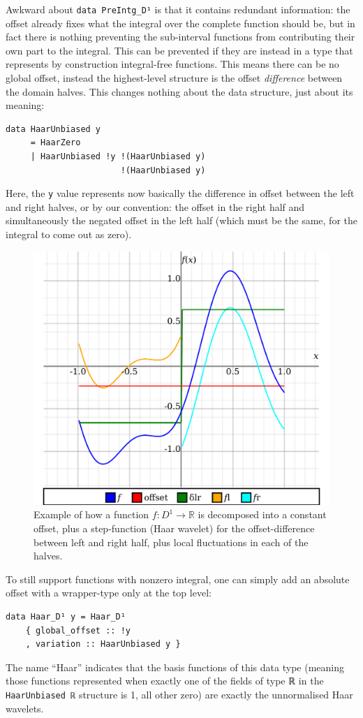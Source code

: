 \documentclass[sigplan,review,anonymous]{acmart}\settopmatter{printfolios=true,printccs=false,printacmref=false}
\theoremstyle{acmplain}
\theoremstyle{acmdefinition}
\begin{document}
\par
Awkward about \lstinline`data PreIntg_D¹` is that it contains redundant information: the offset already fixes what the integral over the complete function should be, but in fact there is nothing preventing the sub-interval functions from contributing their own part to the integral. This can be prevented if they are instead in a type that represents by construction integral-free functions. This means there can be no global offset, instead the highest-level structure is the offset \emph{difference} between the domain halves. This changes nothing about the data structure, just about its meaning:
\begin{lstlisting}
data HaarUnbiased y
     = HaarZero
     | HaarUnbiased !y !(HaarUnbiased y)
                       !(HaarUnbiased y)
\end{lstlisting}
Here, the \lstinline`y` value represents now basically the difference in offset between the left and right halves, or by our convention: the offset in the right half and simultaneously the negated offset in the left half (which must be the same, for the integral to come out as zero).
\begin{figure}
 \centering
 \includegraphics[width=\linewidth]{Haar-domDecompose.pdf}
 \caption{Example of how a function $f:D^1\to\mathbb{R}$ is decomposed into a constant offset, plus a step-function (Haar wavelet) for the offset-difference between left and right half, plus local fluctuations in each of the halves.}
 \label{haarDomDecompose}
\end{figure}
To still support functions with nonzero integral, one can simply add an absolute offset with a wrapper-type only at the top level:
\begin{lstlisting}
data Haar_D¹ y = Haar_D¹
    { global_offset :: !y
    , variation :: HaarUnbiased y }
\end{lstlisting}
The name “Haar” indicates that the basis functions of this data type (meaning those functions represented when exactly one of the fields of type ℝ in the \lstinline`HaarUnbiased ℝ` structure is 1, all other zero) are exactly the unnormalised Haar wavelets.
\end{document}
